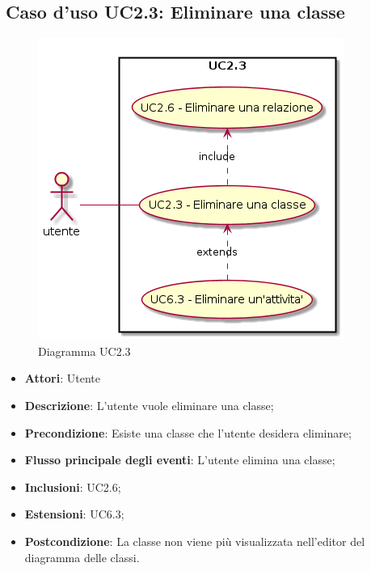 \documentclass[../AnalisiDeiRequisiti.tex]{subfiles}
\begin{document}
	\subsection{Caso d'uso UC2.3: Eliminare una classe}
	\begin{figure} [H]
		\centering
		\includegraphics[scale=0.45]{./Figures/UC2_3.png}
		\caption{Diagramma UC2.3}\label{}
	\end{figure}
	\begin{itemize}
		\item \textbf{Attori}: Utente
		\item \textbf{Descrizione}: L'utente vuole eliminare una classe;
		\item \textbf{Precondizione}: Esiste una classe che l'utente desidera eliminare;
		\item \textbf{Flusso principale degli eventi}: L'utente elimina una classe;
		\item \textbf{Inclusioni}: UC2.6;
		\item \textbf{Estensioni}: UC6.3;
		\item \textbf{Postcondizione}: La classe non viene più visualizzata nell'editor del diagramma delle classi.
	\end{itemize}
\end{document}

